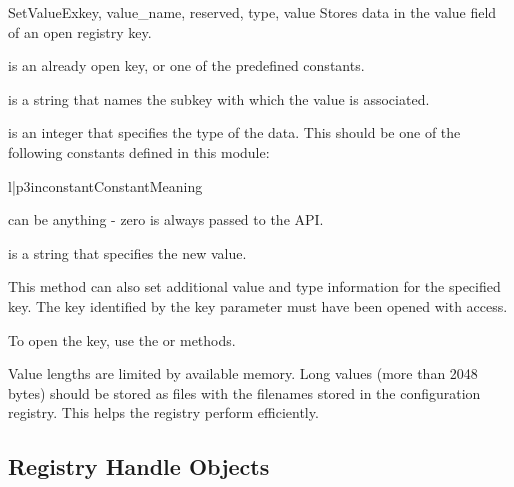 \begin{funcdesc}{SetValueEx}{key, value_name, reserved, type, value}
 Stores data in the value field of an open registry key.

  is an already open key, or one of the predefined 
  constants.

  is a string that names the subkey with which the 
 value is associated.

  is an integer that specifies the type of the data.  
 This should be one of the following constants defined in this module:

 \begin{tableii}{l|p{3in}}{constant}{Constant}{Meaning}
 \end{tableii}

  can be anything - zero is always passed to the 
 API.

  is a string that specifies the new value.

 This method can also set additional value and type information for the
 specified key.  The key identified by the key parameter must have been
 opened with  access.

 To open the key, use the  or 
  methods.

 Value lengths are limited by available memory. Long values (more than
 2048 bytes) should be stored as files with the filenames stored in
 the configuration registry.  This helps the registry perform efficiently.
\end{funcdesc}



\subsection{Registry Handle Objects \label{handle-object}}

